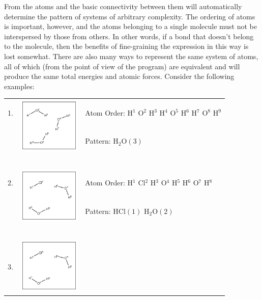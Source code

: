 From the atoms and the basic connectivity between them \progname{} will automatically determine the pattern of systems of arbitrary complexity. The ordering of atoms is important, however, and the atoms belonging to a single molecule must not be interspersed by those from others. In other words, if a bond  that doesn't belong to the molecule, then the benefits of fine-graining the expression in this way is lost somewhat. There are also many ways to represent the same system of atoms, all of which (from the point of view of the program) are equivalent and will produce the same total energies and atomic forces. Consider the following examples:

\begin{table}
\centering
\begin{tabular}{c c l}
	1. & \multirow{2}{*}{ \includegraphics[width=3cm]{images/pattern1} } &
		Atom Order: H$^1$ O$^2$ H$^3$ H$^4$ O$^5$ H$^6$ H$^7$ O$^8$ H$^9$ \\
		& & Pattern: H$_2$O$(3)$ \\\\\\\\\\\\
	2. & \multirow{2}{*}{ \includegraphics[width=3cm]{images/pattern2} } &
		Atom Order: H$^1$ Cl$^2$ H$^3$ O$^4$ H$^5$ H$^6$ O$^7$ H$^8$ \\
		& & Pattern: HCl$(1)$ H$_2$O$(2)$ \\\\\\\\\\\\
	3. & \multirow{2}{*}{ \includegraphics[width=3cm]{images/pattern3} } &

\end{tabular}
\end{table}

